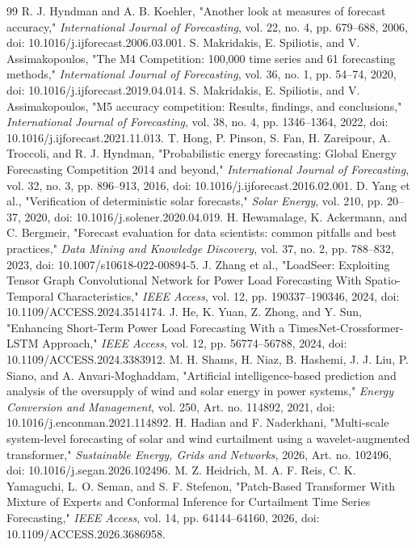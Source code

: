 \documentclass{ieeeaccess}
\begin{document}
\begin{thebibliography}{99}
 R. J. Hyndman and A. B. Koehler, "Another look at measures of forecast accuracy," \emph{International Journal of Forecasting}, vol. 22, no. 4, pp. 679--688, 2006, doi: 10.1016/j.ijforecast.2006.03.001.
 S. Makridakis, E. Spiliotis, and V. Assimakopoulos, "The M4 Competition: 100,000 time series and 61 forecasting methods," \emph{International Journal of Forecasting}, vol. 36, no. 1, pp. 54--74, 2020, doi: 10.1016/j.ijforecast.2019.04.014.
 S. Makridakis, E. Spiliotis, and V. Assimakopoulos, "M5 accuracy competition: Results, findings, and conclusions," \emph{International Journal of Forecasting}, vol. 38, no. 4, pp. 1346--1364, 2022, doi: 10.1016/j.ijforecast.2021.11.013.
 T. Hong, P. Pinson, S. Fan, H. Zareipour, A. Troccoli, and R. J. Hyndman, "Probabilistic energy forecasting: Global Energy Forecasting Competition 2014 and beyond," \emph{International Journal of Forecasting}, vol. 32, no. 3, pp. 896--913, 2016, doi: 10.1016/j.ijforecast.2016.02.001.
 D. Yang et al., "Verification of deterministic solar forecasts," \emph{Solar Energy}, vol. 210, pp. 20--37, 2020, doi: 10.1016/j.solener.2020.04.019.
 H. Hewamalage, K. Ackermann, and C. Bergmeir, "Forecast evaluation for data scientists: common pitfalls and best practices," \emph{Data Mining and Knowledge Discovery}, vol. 37, no. 2, pp. 788--832, 2023, doi: 10.1007/s10618-022-00894-5.
 J. Zhang et al., "LoadSeer: Exploiting Tensor Graph Convolutional Network for Power Load Forecasting With Spatio-Temporal Characteristics," \emph{IEEE Access}, vol. 12, pp. 190337--190346, 2024, doi: 10.1109/ACCESS.2024.3514174.
 J. He, K. Yuan, Z. Zhong, and Y. Sun, "Enhancing Short-Term Power Load Forecasting With a TimesNet-Crossformer-LSTM Approach," \emph{IEEE Access}, vol. 12, pp. 56774--56788, 2024, doi: 10.1109/ACCESS.2024.3383912.
 M. H. Shams, H. Niaz, B. Hashemi, J. J. Liu, P. Siano, and A. Anvari-Moghaddam, "Artificial intelligence-based prediction and analysis of the oversupply of wind and solar energy in power systems," \emph{Energy Conversion and Management}, vol. 250, Art. no. 114892, 2021, doi: 10.1016/j.enconman.2021.114892.
 H. Hadian and F. Naderkhani, "Multi-scale system-level forecasting of solar and wind curtailment using a wavelet-augmented transformer," \emph{Sustainable Energy, Grids and Networks}, 2026, Art. no. 102496, doi: 10.1016/j.segan.2026.102496.
 M. Z. Heidrich, M. A. F. Reis, C. K. Yamaguchi, L. O. Seman, and S. F. Stefenon, "Patch-Based Transformer With Mixture of Experts and Conformal Inference for Curtailment Time Series Forecasting," \emph{IEEE Access}, vol. 14, pp. 64144--64160, 2026, doi: 10.1109/ACCESS.2026.3686958.

\end{thebibliography}
\end{document}
